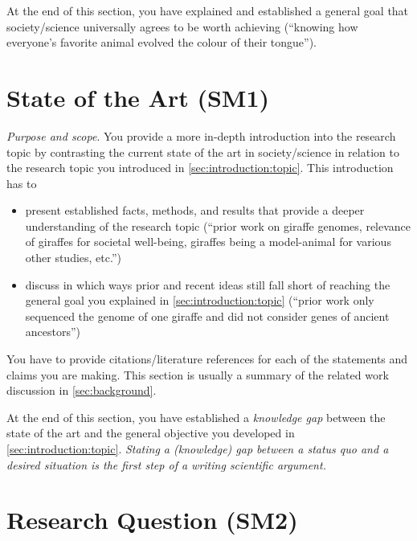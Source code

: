 \documentclass[
  numbers=autoendperiod,
  ngerman,  %
  a4paper,  %
  twoside,  %
  bibliography=totoc,
  headsepline,
  cleardoublepage=empty,
  parskip=half,
  draft=false
]{scrbook}
\theoremstyle{break}
\begin{document}
At the end of this section, you have explained and established a general goal that society/science universally agrees to be worth achieving (``knowing how everyone's favorite animal evolved the colour of their tongue'').

\section{State of the Art (SM1)}\label{sec:introduction:state-of-art}

\emph{Purpose and scope}.
You provide a more in-depth introduction into the research topic by contrasting the current state of the art in society/science in relation to the research topic you introduced in \cref{sec:introduction:topic}.
This introduction has to

\begin{itemize}
  \item present established facts, methods, and results that provide a deeper understanding of the research topic (``prior work on giraffe genomes, relevance of giraffes for societal well-being, giraffes being a model-animal for various other studies, etc.'')
  \item discuss in which ways prior and recent ideas still fall short of reaching the general goal you explained in \cref{sec:introduction:topic} (``prior work only sequenced the genome of one giraffe and did not consider genes of ancient ancestors'')
\end{itemize}

You have to provide citations/literature references for each of the statements and claims you are making.
This section is usually a summary of the related work discussion in \cref{sec:background}.

At the end of this section, you have established a \emph{knowledge gap} between the state of the art and the general objective you developed in \cref{sec:introduction:topic}.
\emph{Stating a (knowledge) gap between a status quo and a desired situation is the \emph{first step} of a writing scientific argument.}


\section{Research Question (SM2)}\label{sec:introduction:research-question}
\end{document}
